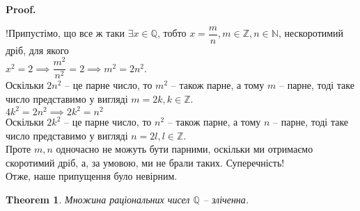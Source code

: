 \documentclass[a4paper, 14pt]{article}
\makeatletter
\def\qed{$\blacksquare$}
\theoremstyle{theoremdd}
\newtheorem{theorem}{Theorem}[subsection]
\theoremstyle{theoremdd}
\theoremstyle{theoremdd}
\theoremstyle{theoremdd}
\theoremstyle{theoremdd}
\theoremstyle{theoremdd}
\theoremstyle{theoremdd}
\theoremstyle{theoremdd}
\renewenvironment{proof}[1][Proof.\\]{\par
\pushQED{\hfill \qed}%
\normalfont \topsep6\p@\@plus6\p@\relax
\trivlist
\item\relax
{\bfseries
#1\@addpunct{.}}\hspace\labelsep\ignorespaces
}{%
\popQED\endtrivlist\@endpefalse
}
\makeatother
\begin{document}
	\begin{proof}
	!Припустімо, що все ж таки $\exists x \in \mathbb{Q}$, тобто $x= \dfrac{m}{n}, m \in \mathbb{Z}, n \in \mathbb{N}$, нескоротимий дріб, для якого\\
	$x^2 = 2 \implies \dfrac{m^2}{n^2} = 2 \implies m^2 = 2n^2$.\\
	Оскільки $2n^2$ -- це парне число, то $m^2$ -- також парне, а тому $m$ -- парне, тоді таке число представимо у вигляді $m = 2k, k \in \mathbb{Z}$.\\
	$4k^2 = 2n^2 \implies 2k^2 = n^2$\\
	Оскільки $2k^2$ -- це парне число, то $n^2$ -- також парне, а тому $n$ -- парне, тоді таке число представимо у вигляді $n = 2l, l \in \mathbb{Z}$.\\
	Проте $m,n$ одночасно не можуть бути парними, оскільки ми отримаємо скоротимий дріб, а, за умовою, ми не брали таких. Суперечність!\\
	Отже, наше припущення було невірним.
	\end{proof}
	
	\iffalse
	\begin{theorem}
	Множина раціональних чисел $\mathbb{Q}$ -- зліченна.
	\end{theorem}
\end{document}
